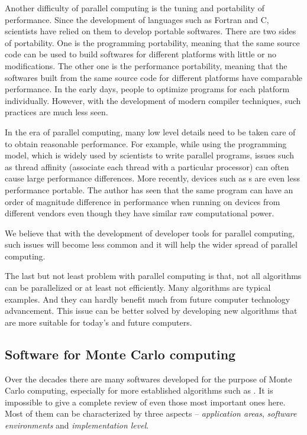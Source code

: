 Another difficulty of parallel computing is the tuning and portability of performance. Since the development of languages such as Fortran and C, scientists have relied on them to develop portable softwares. There are two sides of portability. One is the programming portability, meaning that the same source code can be used to build softwares for different platforms with little or no modifications. The other one is the performance portability, meaning that the softwares built from the same source code for different platforms have comparable performance. In the early days, people  to optimize programs for each platform individually. However, with the development of modern compiler techniques, such practices are much less seen.

In the era of parallel computing, many low level details need to be taken care of to obtain reasonable performance. For example, while using the \openmp programming model, which is widely used by scientists to write parallel programs, issues such as thread affinity (associate each thread with a particular processor) can often cause large performance differences. More recently, devices such as \gpu{}s are even less performance portable. The author has seen that the same \opencl \cite{opencl} program can have an order of magnitude difference in performance when running on devices from different vendors even though they have similar raw computational power.

We believe that with the development of developer tools for parallel computing, such issues will become less common and it will help the wider spread of parallel computing.

The last but not least problem with parallel computing is that, not all algorithms can be parallelized or at least not efficiently. Many \mcmc algorithms are typical examples. And they can hardly benefit much from future computer technology advancement. This issue can be better solved by developing new algorithms that are more suitable for today's and future computers.

\subsection{Software for Monte Carlo computing}
\label{sub:Softwares for Monte Carlo computing}

Over the decades there are many softwares developed for the purpose of Monte Carlo computing, especially for more established algorithms such as \mcmc. It is impossible to give a complete review of even those most important ones here. Most of them can be characterized by three aspects -- \emph{application areas}, \emph{software environments} and \emph{implementation level}.

